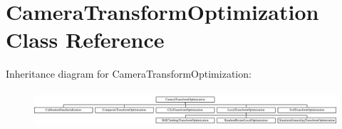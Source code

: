 \hypertarget{classCameraTransformOptimization}{\section{\-Camera\-Transform\-Optimization \-Class \-Reference}
\label{classCameraTransformOptimization}
}
\-Inheritance diagram for \-Camera\-Transform\-Optimization\-:\begin{figure}[H]
\begin{center}
\leavevmode
\includegraphics[height=1.312500cm]{classCameraTransformOptimization}
\end{center}
\end{figure}
